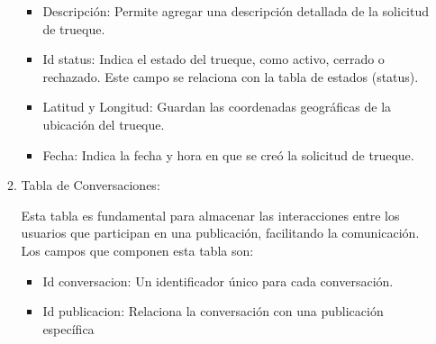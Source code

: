 \documentclass[11pt, a4paper, oneside]{book}
\begin{document}
\begin{itemize}
\begin{enumerate}
\begin{itemize}
\end{itemize} 

\begin{itemize} 

    \item Descripción: Permite agregar una descripción detallada de la solicitud de trueque. 

\end{itemize} 

\begin{itemize} 

    \item Id status: Indica el estado del trueque, como activo, cerrado o rechazado. Este campo se relaciona con la tabla de estados (status). 

\end{itemize} 

\begin{itemize} 

    \item Latitud y Longitud: Guardan las coordenadas geográficas de la ubicación del trueque.  

\end{itemize} 

\begin{itemize} 

    \item Fecha: Indica la fecha y hora en que se creó la solicitud de trueque. 

\end{itemize} 

 

 

    \item Tabla de Conversaciones: 

 

Esta tabla es fundamental para almacenar las interacciones entre los usuarios que participan en una publicación, facilitando la comunicación. Los campos que componen esta tabla son: 

 

\begin{itemize} 

    \item  Id conversacion: Un identificador único para cada conversación.  

\end{itemize} 

\begin{itemize} 

    \item Id publicacion: Relaciona la conversación con una publicación específica 


\end{itemize}
\end{enumerate}
\end{itemize}
\end{document}
